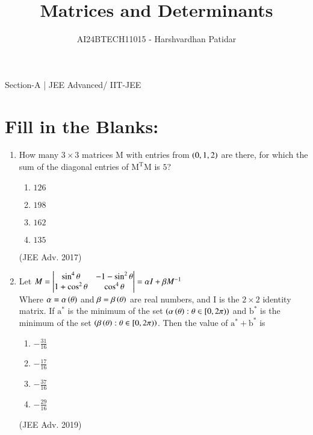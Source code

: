 \documentclass[journal,12pt,twocolumn]{IEEEtran}
\theoremstyle{remark}
\begin{document}

\vspace{3cm}

\title{Matrices and Determinants}
\author{AI24BTECH11015 - Harshvardhan Patidar}
\maketitle
\newpage
\bigskip

\renewcommand{\thefigure}{\theenumi}
\renewcommand{\thetable}{\theenumi}



Section-A | JEE Advanced/ IIT-JEE
 

		\section{Fill in the Blanks:}
			\begin{enumerate}
				\item
					How many $3 \times 3$ matrices M with entries from $\left(0,1,2\right)$ are there, for which the sum of the diagonal entries of $\mathrm{M^TM}$ is $5$?
						\begin{enumerate}[label=(\alph*)]
							\item $126$
							\item $198$
							\item $162$
							\item $135$
						\end{enumerate}
						\hfill (JEE Adv. 2017)\\
				\item
					Let $M= \begin{vmatrix}
						\sin^4 \theta & -1 -\sin^2 \theta\\
						1+\cos^2 \theta & \cos^4 \theta
						\end{vmatrix} = 
						\alpha I + \beta M^{-1}$\\
					Where $\alpha = \alpha \left(\theta\right)$ and $\beta = \beta \left(\theta\right)$ are real numbers, and I is the $2 \times 2$ identity matrix. If $\mathrm{a^*}$ is the minimum of the set $\left(\alpha \left(\theta\right) : \theta \in [0, 2 \pi)\right)$ and $\mathrm{b^*}$ is the minimum of the set $\left(\beta \left(\theta\right) : \theta \in [0, 2 \pi)\right)$. Then the value of $\mathrm{a^*} + \mathrm{b^*}$ is
						\begin{enumerate}[label=(\alph*)]
							\item $-\frac{31}{16}$
							\item $-\frac{17}{16}$
							\item $-\frac{37}{16}$
							\item $-\frac{29}{16}$
						\end{enumerate}
						\hfill (JEE Adv. 2019)\\
			\end{enumerate}
\end{document}
